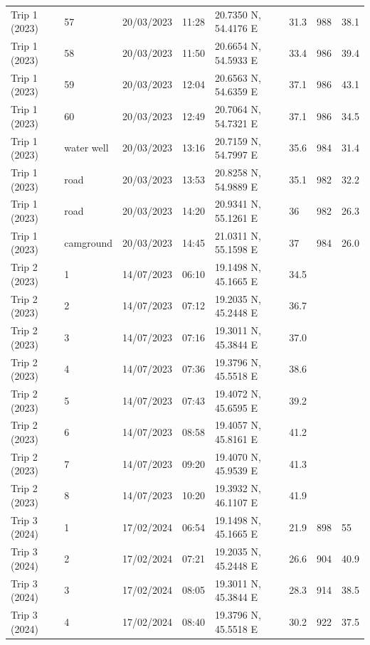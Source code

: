 \begin{scriptsize}
\begin{longtable}{llllllll}
Trip 1 (2023) & 57 & 20/03/2023 & 11:28 & 20.7350 N, 54.4176 E & 31.3 & 988 & 38.1 \\
Trip 1 (2023) & 58 & 20/03/2023 & 11:50 & 20.6654 N, 54.5933 E & 33.4 & 986 & 39.4 \\
Trip 1 (2023) & 59 & 20/03/2023 & 12:04 & 20.6563 N, 54.6359 E & 37.1 & 986 & 43.1 \\
Trip 1 (2023) & 60 & 20/03/2023 & 12:49 & 20.7064 N, 54.7321 E & 37.1 & 986 & 34.5 \\
Trip 1 (2023) & water well & 20/03/2023 & 13:16 & 20.7159 N, 54.7997 E & 35.6 & 984 & 31.4 \\
Trip 1 (2023) & road & 20/03/2023 & 13:53 & 20.8258 N, 54.9889 E & 35.1 & 982 & 32.2 \\
Trip 1 (2023) & road & 20/03/2023 & 14:20 & 20.9341 N, 55.1261 E & 36 & 982 & 26.3 \\
Trip 1 (2023) & camground & 20/03/2023 & 14:45 & 21.0311 N, 55.1598 E & 37 & 984 & 26.0 \\
Trip 2 (2023) & 1 & 14/07/2023 & 06:10 & 19.1498 N, 45.1665 E & 34.5 & \textemdash{} & \textemdash{} \\
Trip 2 (2023) & 2 & 14/07/2023 & 07:12 & 19.2035 N, 45.2448 E & 36.7 & \textemdash{} & \textemdash{} \\
Trip 2 (2023) & 3 & 14/07/2023 & 07:16 & 19.3011 N, 45.3844 E & 37.0 & \textemdash{} & \textemdash{} \\
Trip 2 (2023) & 4 & 14/07/2023 & 07:36 & 19.3796 N, 45.5518 E & 38.6 & \textemdash{} & \textemdash{} \\
Trip 2 (2023) & 5 & 14/07/2023 & 07:43 & 19.4072 N, 45.6595 E & 39.2 & \textemdash{} & \textemdash{} \\
Trip 2 (2023) & 6 & 14/07/2023 & 08:58 & 19.4057 N, 45.8161 E & 41.2 & \textemdash{} & \textemdash{} \\
Trip 2 (2023) & 7 & 14/07/2023 & 09:20 & 19.4070 N, 45.9539 E & 41.3 & \textemdash{} & \textemdash{} \\
Trip 2 (2023) & 8 & 14/07/2023 & 10:20 & 19.3932 N, 46.1107 E & 41.9 & \textemdash{} & \textemdash{} \\
Trip 3 (2024) & 1 & 17/02/2024 & 06:54 & 19.1498 N, 45.1665 E & 21.9 & 898 & 55 \\
Trip 3 (2024) & 2 & 17/02/2024 & 07:21 & 19.2035 N, 45.2448 E & 26.6 & 904 & 40.9 \\
Trip 3 (2024) & 3 & 17/02/2024 & 08:05 & 19.3011 N, 45.3844 E & 28.3 & 914 & 38.5 \\
Trip 3 (2024) & 4 & 17/02/2024 & 08:40 & 19.3796 N, 45.5518 E & 30.2 & 922 & 37.5 \\

\end{longtable}
\end{scriptsize}
